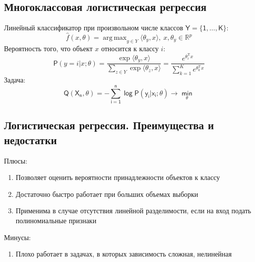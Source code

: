 \documentclass{article}
\DeclareMathOperator*{\argmax}{arg\,max}
\begin{document}
\subsection{Многоклассовая логистическая регрессия}
Линейный классификатор при произвольном числе классов $\mathsf{Y=\{1,\ldots,K\}}$: 
\begin{equation*}
	\hat{f}(x,\theta)=\argmax_{y\in Y}\langle \theta_y,x \rangle, \ x,\theta_y\in\mathbb{R}^p
\end{equation*}
Вероятность того, что объект $x$ относится к классу $i$:
\begin{equation*}
	\mathsf{P}(y=i|x;\theta)=\frac{\exp{\langle \theta_y,x \rangle}}{\sum\limits_{z\in Y}\exp{\langle \theta_z,x \rangle}}=\frac{e^{\theta_i^{\mathrm{T}}x}}{\sum\limits_{k=1}^Ke^{\theta_k^{\mathrm{T}}x}}
\end{equation*}
Задача:
\begin{equation*}
	\mathsf{Q(X_n, \theta)=-\sum\limits_{i=1}^n\log P(y_i|x_i;\theta)\to \min\limits_\theta }
\end{equation*}

\subsection{Логистическая регрессия. Преимущества и недостатки}
Плюсы:
\begin{enumerate}
	\item Позволяет оценить вероятности принадлежности объектов к классу
	\item Достаточно быстро работает при больших объемах выборки
	\item Применима в случае отсутствия линейной разделимости, если на вход подать полиномиальные признаки
\end{enumerate}
Минусы:
\begin{enumerate}
	\item Плохо работает в задачах, в которых зависимость сложная, нелинейная
\end{enumerate}
\end{document}
